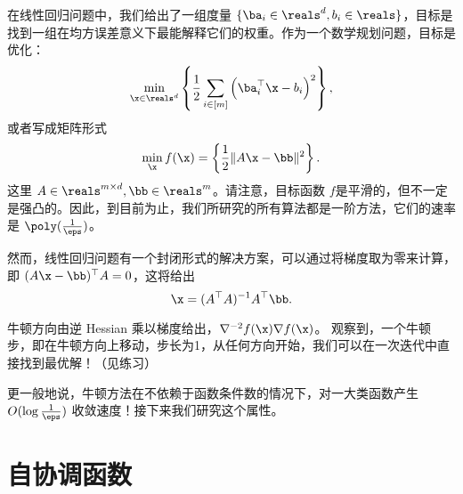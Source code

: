 在线性回归问题中，我们给出了一组度量 $\{\ba_i \in \reals^d, b_i \in \reals\} $，目标是找到一组在均方误差意义下最能解释它们的权重。作为一个数学规划问题，目标是优化：
$$ \min_{\x \in \reals^d} \left\{ \frac{1}{2} \sum_{i \in [m]} \left( \ba_i^\top \x - b_i \right)^2 \right\} , $$
或者写成矩阵形式
$$ \min_\x f(\x) =  \left\{  \frac{1}{2} \| A \x - \bb \|^2 \right\} . $$
这里 $A \in \reals^{m \times d}, \bb \in \reals^m$。请注意，目标函数 $f$是平滑的，但不一定是强凸的。因此，到目前为止，我们所研究的所有算法都是一阶方法，它们的速率是 $\poly(\frac{1}{\eps})$。

然而，线性回归问题有一个封闭形式的解决方案，可以通过将梯度取为零来计算，即 $ (A \x - \bb)^\top A   = 0$，这将给出
$$ \x = (A^\top A)^{-1} A^\top \bb . $$

牛顿方向由逆 Hessian 乘以梯度给出，$\nabla^{-2} f(\x) \nabla f(\x)$。
观察到，一个牛顿步，即在牛顿方向上移动，步长为1，从任何方向开始，我们可以在一次迭代中直接找到最优解！（见练习）

更一般地说，牛顿方法在不依赖于函数条件数的情况下，对一大类函数产生 $O(\log \frac{1}{\eps})$  收敛速度！接下来我们研究这个属性。



\section{
    自协调函数
    }

